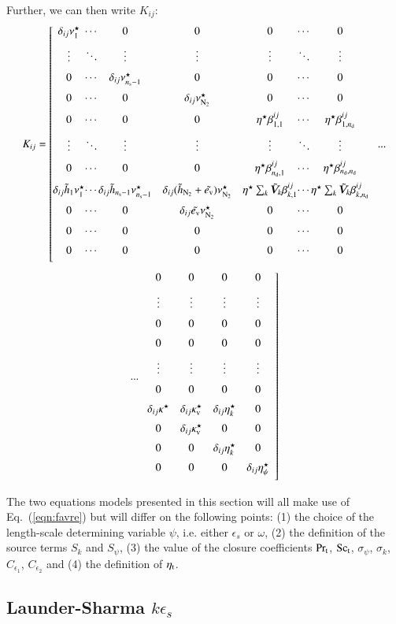 \documentclass{warpdoc}
\newcommand{\alb}{\vspace{0.2cm}\\} %
\newcommand{\Sct}{{{\rm Sc}_{\rm t}}}
\newcommand{\Prt}{{{\rm Pr}_{\rm t}}}
\newcommand{\nd}{{{n}_{\rm d}}}
\newcommand{\ns}{{{n}_{\rm s}}}
\newcommand{\turb}{_{\rm t}}
\newcommand{\etat}{{\eta\turb}}
\newcommand{\ev}{e_{\rm v}}
\begin{document}
Further, we can then write $K_{ij}$:
%
\begin{displaymath}
 K_{ij}=\left[
     \begin{array}{@{}c@{}c@{}ccc@{}c@{}c}
        \delta_{ij} \nu_1^\star&\cdots&0&0&0&\cdots&0\alb
        \vdots&\ddots&\vdots&\vdots&\vdots&\ddots&\vdots\alb
        0&\cdots&\delta_{ij} \nu_{\ns-1}^\star&0&0&\cdots&0\alb
        0&\cdots&0&\delta_{ij} \nu_{\rm N_2}^\star&0&\cdots&0\alb
        0&\cdots&0&0&\eta^\star \beta^{ij}_{1,1}&\cdots& \eta^\star \beta^{ij}_{1,\nd}\alb
        \vdots&\ddots&\vdots&\vdots&\vdots&\ddots& \vdots \alb
        0&\cdots&0&0&\eta^\star \beta^{ij}_{\nd,1}&\cdots& \eta^\star \beta^{ij}_{\nd,\nd} \alb
        \delta_{ij} \wtilde{h}_1 \nu^\star_1&\cdots&\delta_{ij} {\wtilde{h}_{\ns-1}} \nu^\star_{\ns-1}&\delta_{ij} (\wtilde{h}_{\rm N_2}+{\wtilde{\ev}}) \nu^\star_{\rm N_2}&\eta^\star \sum_k {\wtilde{\bm{V}}_k} \beta^{ij}_{k,1}&\cdots&\eta^\star \sum_k {\wtilde{\bm{V}}_k} \beta^{ij}_{k,\nd}\alb
        0&\cdots&0&\delta_{ij} {\wtilde{\ev}} \nu^\star_{\rm N_2}&0&\cdots&0\alb
        0&\cdots&0&0&0&\cdots&0\alb
        0&\cdots&0&0&0&\cdots&0\alb
     \end{array}
   \right. ...
\end{displaymath}
%
%
\begin{displaymath}
 ...\left.
     \begin{array}{cccc}
        0&0&0&0\alb
        \vdots&\vdots&\vdots&\vdots\alb
        0&0&0&0\alb
        0&0&0&0\alb
        \vdots&\vdots&\vdots&\vdots\alb
        0&0&0&0\alb
        \delta_{ij}  \kappa^\star &\delta_{ij} \kappa_{\rm v}^\star&\delta_{ij} \eta_k^\star&0\alb
        0&\delta_{ij} \kappa_{\rm v}^\star&0&0\alb
        0&0&\delta_{ij} \eta_k^\star&0\alb
        0&0&0&\delta_{ij} \eta_\psi^\star\alb
     \end{array}
   \right]
\end{displaymath}
%

The two equations models presented in this section will
all make use of Eq.\ (\ref{eqn:favre}) but
will differ on the following points: (1) the choice of the length-scale
determining variable $\psi$, i.e. either $\epsilon_s$ or $\omega$,
(2) the definition of the source terms $S_k$ and $S_\psi$,
(3) the value of the closure coefficients $\Prt$, $\Sct$, $\sigma_\psi$,
   $\sigma_k$, $C_{\epsilon_1}$, $C_{\epsilon_2}$
and (4) the definition of $\etat$.



\subsection{Launder-Sharma $k\epsilon_s$}
\end{document}

